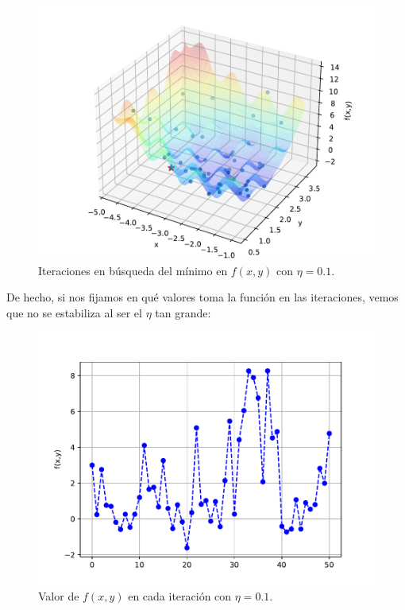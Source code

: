 \documentclass[12pt]{scrartcl}
\begin{document}
{\begin{figure}[H]
  \centering
  \includegraphics[scale=0.6]{media/E1-2-loweta-all.pdf}
  \caption{Iteraciones en búsqueda del mínimo en $f(x,y)$ con $\eta = 0.1$.}
\end{figure}

De hecho, si nos fijamos en qué valores toma la función en las iteraciones, vemos que no se estabiliza al ser el $\eta$ tan grande:

\begin{figure}[H]
  \centering
  \includegraphics[scale=0.6]{media/f_evolution_e1-2-01.pdf}
  \caption{Valor de $f(x,y)$ en cada iteración con $\eta = 0.1$.}
\end{figure}

}
\end{document}
